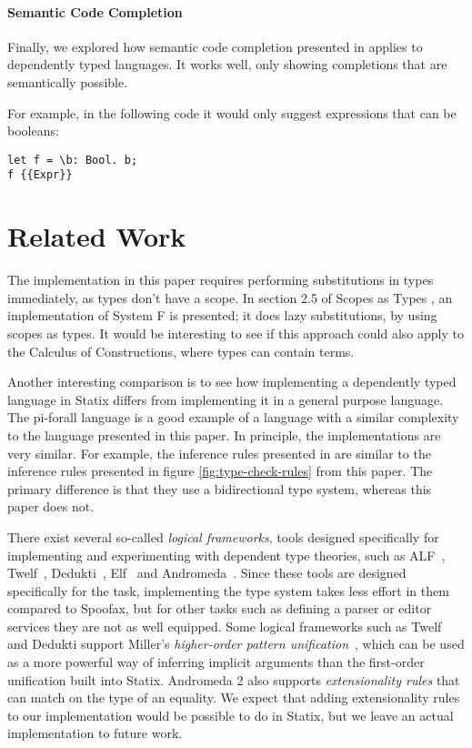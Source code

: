 \documentclass[a4paper,UKenglish,cleveref, autoref, thm-restate]{oasics-v2021}
\begin{document}
\paragraph*{Semantic Code Completion}
Finally, we explored how semantic code completion presented in \cite{codecompletion} applies to dependently typed languages. It works well, only showing completions that are semantically possible.

For example, in the following code it would only suggest expressions that can be booleans:
\begin{lstlisting}
let f = \b: Bool. b;
f {{Expr}}
\end{lstlisting}


\section{Related Work}
The implementation in this paper requires performing substitutions in types immediately, as types don't have a scope. In section 2.5 of Scopes as Types \cite{scopes_as_types}, an implementation of System F is presented; it does lazy substitutions, by using scopes as types. It would be interesting to see if this approach could also apply to the Calculus of Constructions, where types can contain terms. 

Another interesting comparison is to see how implementing a dependently typed language in Statix differs from implementing it in a general purpose language. The pi-forall language\cite{pi_forall} is a good example of a language with a similar complexity to the language presented in this paper. In principle, the implementations are very similar. For example, the inference rules presented in \cite{pi_forall} are similar to the inference rules presented in figure \ref{fig:type-check-rules} from this paper. The primary difference is that they use a bidirectional type system, whereas this paper does not.

There exist several so-called \emph{logical frameworks}, tools designed specifically for implementing and experimenting with dependent type theories, such as ALF~\cite{MagnussonN93}, Twelf~\cite{PfenningS99}, Dedukti~\cite{BoespflugCH12}, Elf~\cite{pfenning_1991} and Andromeda~\cite{BauerHP20}. Since these tools are designed specifically for the task, implementing the type system takes less effort in them compared to Spoofax, but for other tasks such as defining a parser or editor services they are not as well equipped. Some logical frameworks such as Twelf and Dedukti support Miller's \emph{higher-order pattern unification}~\cite{Miller89}, which can be used as a more powerful way of inferring implicit arguments than the first-order unification built into Statix. Andromeda 2 also supports \emph{extensionality rules} that can match on the type of an equality. We expect that adding extensionality rules to our implementation would be possible to do in Statix, but we leave an actual implementation to future work.
\end{document}
